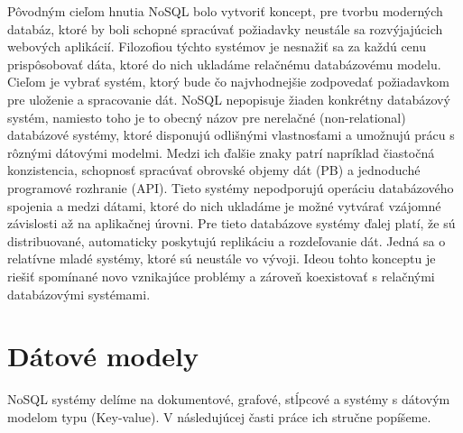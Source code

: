 \documentclass[11pt,twoside,a4paper]{book}
\begin{document}
Pôvodným cieľom hnutia NoSQL bolo vytvoriť koncept, pre tvorbu moderných databáz, ktoré by boli schopné spracúvať požiadavky neustále sa rozvýjajúcich webových aplikácií. Filozofiou týchto systémov je nesnažiť sa za každú cenu prispôsobovať dáta, ktoré do nich ukladáme relačnému databázovému modelu. Cieľom je vybrať systém, ktorý bude čo najvhodnejšie zodpovedať požiadavkom pre uloženie a spracovanie dát. NoSQL nepopisuje žiaden konkrétny databázový systém, namiesto toho je to obecný názov pre nerelačné (non-relational) databázové systémy, ktoré disponujú odlišnými vlastnosťami a umožnujú prácu s rôznými dátovými modelmi. Medzi ich ďalšie znaky patrí napríklad čiastočná konzistencia, schopnosť spracúvať obrovské objemy dát (PB) a jednoduché programové rozhranie (API). Tieto systémy nepodporujú operáciu databázového spojenia a medzi dátami, ktoré do nich ukladáme je možné vytvárať vzájomné závislosti až na aplikačnej úrovni. Pre tieto databázove systémy ďalej platí, že sú distribuované, automaticky poskytujú replikáciu a rozdeľovanie dát. Jedná sa o relatívne mladé systémy, ktoré sú neustále vo vývoji. Ideou tohto konceptu je riešiť spomínané novo vznikajúce problémy a zároveň koexistovať s relačnými databázovými systémami.


\section{Dátové modely}

NoSQL systémy delíme na dokumentové, grafové, stĺpcové a systémy s dátovým modelom typu  (Key-value). V následujúcej časti práce ich stručne popíšeme.

% 
% 
% 
% 
\end{document}
